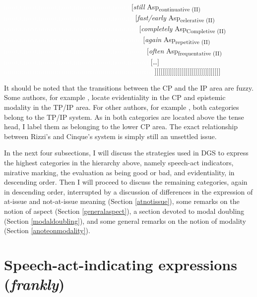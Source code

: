 \begin{exe}
{\textcolor{white}{nnnnnnnnnnnnnnnnnnnnnnnnnnnnnnnnn}$[$\textit{still} Asp\textsubscript{continuative (II)} \\
\textcolor{white}{nnnnnnnnnnnnnnnnnnnnnnnnnnnnnnnnnn}$[$\textit{fast/early} Asp\textsubscript{celerative (II)} \\
\textcolor{white}{nnnnnnnnnnnnnnnnnnnnnnnnnnnnnnnnnnn}$[$\textit{completely} Asp\textsubscript{Completive (II)} \\
\textcolor{white}{nnnnnnnnnnnnnnnnnnnnnnnnnnnnnnnnnnnn}$[$\textit{again} Asp\textsubscript{repetitive (II)} \\
\textcolor{white}{nnnnnnnnnnnnnnnnnnnnnnnnnnnnnnnnnnnnn}$[$\textit{often} Asp\textsubscript{frequentative (II)} \\
\textcolor{white}{nnnnnnnnnnnnnnnnnnnnnnnnnnnnnnnnnnnnnn}$[$\dots$]$ \\
\textcolor{white}{nnnnnnnnnnnnnnnnnnnnnnnnnnnnnnnnnnnnnnn}$]]]]]]]]]]]]]]]]]]]]]]]]]]]]]]]]]]$ }
\end{exe}

\noindent It should be noted that the transitions between the CP and the IP area are fuzzy. Some authors, for example \citet{van2013clause}, locate evidentiality in the CP and epistemic modality in the TP/IP area. For other authors, for example \citet{matthewson2007evidentials}, both categories belong to the TP/IP system. As in \citet{cinque1999adverbs, cinque2006restructuring} both categories are located above the tense head, I label them as belonging to the lower CP area. The exact relationship between Rizzi's and Cinque's system is simply still an unsettled issue.

In the next four subsections, I will discuss the strategies used in DGS to express the highest categories in the hierarchy above, namely speech-act indicators, mirative marking, the evaluation as being good or bad, and evidentiality, in descending order. Then I will proceed to discuss the remaining categories, again in descending order, interrupted by a discussion of differences in the expression of at-issue and not-at-issue meaning (Section \ref{atnotissue}), some remarks on the notion of aspect (Section \ref{generalaspect}), a section devoted to modal doubling (Section \ref{modaldoubling}), and some general remarks on the notion of modality (Section \ref{anoteonmodality}).

\section{Speech-act-indicating expressions (\textit{frankly})}
